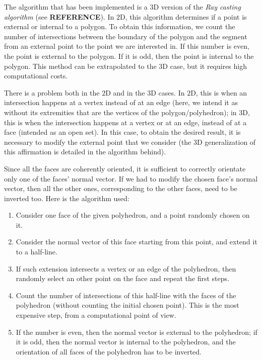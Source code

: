 The algorithm that has been implemented is a $3$D version of the \textit{Ray casting algorithm} (see \textbf{REFERENCE}). In $2$D, this algorithm determines if a point is external or internal to a polygon. To obtain this information, we count the number of intersections between the boundary of the polygon and the segment from an external point to the point we are interested in. If this number is even, the point is external to the polygon. If it is odd, then the point is internal to the polygon. This method can be extrapolated to the $3$D case, but it requires high computational costs. 

There is a problem both in the $2$D and in the $3$D cases. In $2$D, this is when an intersection happens at a vertex instead of at an edge (here, we intend it as without its extremities that are the vertices of the polygon/polyhedron); in $3$D, this is when the intersection happens at a vertex or at an edge, instead of at a face (intended as an open set). In this case, to obtain the desired result, it is necessary to modify the external point that we consider (the $3$D generalization of this affirmation is detailed in the algorithm behind). 

Since all the faces are coherently oriented, it is sufficient to correctly orientate only one of the faces' normal vector. If we had to modify the chosen face's normal vector, then all the other ones, corresponding to the other faces, need to be inverted too. Here is the algorithm used:
\begin{enumerate}
\item Consider one face of the given polyhedron, and a point randomly chosen on it. 
\item Consider the normal vector of this face starting from this point, and extend it to a half-line. 
\item If such extension intersects a vertex or an edge of the polyhedron, then randomly select an other point on the face and repeat the first steps.
\item Count the number of intersections of this half-line with the faces of the polyhedron (without counting the initial chosen point). This is the most expensive step, from a computational point of view. 
\item If the number is even, then the normal vector is external to the polyhedron; if it is odd, then the normal vector is internal to the polyhedron, and the orientation of all faces of the polyhedron has to be inverted.
\end{enumerate}


